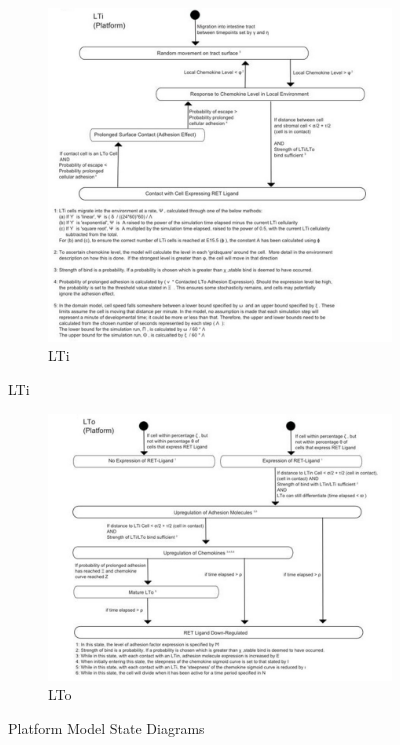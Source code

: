 \documentclass{UoYCSproject}
\begin{document}
\begin{figure}[htp]\ContinuedFloat
\centering
\begin{subfigure}{0.95\textwidth}
\centering
\includegraphics[width=\textwidth]{Appendix/Models/Platform/LTi}
\caption{LTi}
\end{subfigure}
\end{figure}

\begin{figure}[htp]\ContinuedFloat
\centering
\begin{subfigure}{0.95\textwidth}
\centering
\includegraphics[width=\textwidth]{Appendix/Models/Platform/LTo}
\caption{LTo}
\end{subfigure}

\caption{Platform Model State Diagrams\cite{kieran_thesis}}
\label{fig:platform_state_diagrams}
\end{figure}
\end{document}
